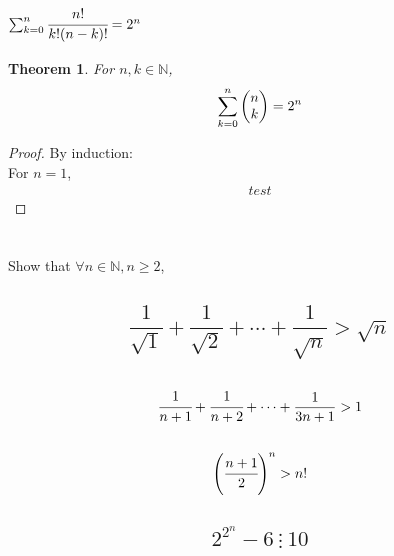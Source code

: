 \documentclass[]{article}
\newcommand{\N}{\mathbb{N}}
\newcommand{\divisible}{ \ \vdots \ }
\newtheorem{theorem}{Theorem}
\begin{document}
\newpage
\subsubsection{$\sum_{k=0}^{n} \cfrac{n!}{k!(n-k)!} = 2^n$}
\begin{theorem}
    For $n,k \in \N$,
    $$\sum_{k=0}^{n} \mqty(n\\k) = 2^n$$
\end{theorem}
\begin{proof}
    By induction:\\
    For $n=1$,
    \begin{align*}
        test
    \end{align*}
\end{proof}












\newpage
\section{}
Show that $\forall n \in \N, n \geq 2$,

\subsection{
    $$\frac{1}{\sqrt{1}} + \frac{1}{\sqrt{2}} + \cdots + \frac{1}{\sqrt{n}} > \sqrt{n}$$
}




\subsection{
    $$\cfrac{1}{n+1} + \cfrac{1}{n+2} + \cdots + \frac{1}{3n+1} > 1$$
}





\subsection{
    $$\qty(\cfrac{n+1}{2})^n > n!$$
}





\subsection{
    $$2^{2^n} - 6 \divisible 10$$
}
\end{document}
